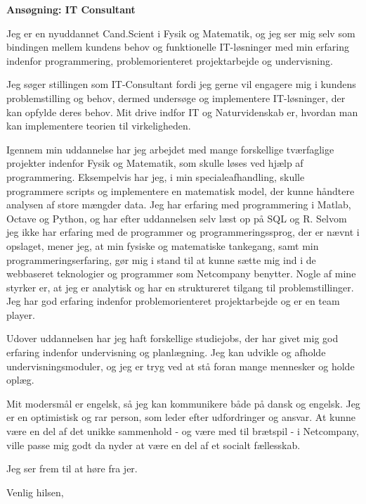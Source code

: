 \documentclass[10pt,a4paper]{letter}
\begin{document}
\begin{letter}{}
\opening{\textbf{Ansøgning: IT Consultant}}
Jeg er en nyuddannet Cand.Scient i Fysik og Matematik, og jeg ser mig selv som bindingen mellem kundens behov og funktionelle IT-løsninger med min erfaring indenfor programmering, problemorienteret projektarbejde og undervisning.

Jeg søger stillingen som IT-Consultant fordi jeg gerne vil engagere mig i kundens problemstilling og behov, dermed undersøge og implementere IT-løsninger, der kan opfylde deres behov. Mit drive indfor IT og Naturvidenskab er, hvordan man kan implementere teorien til virkeligheden.   

Igennem min uddannelse har jeg arbejdet med mange forskellige tværfaglige projekter indenfor Fysik og Matematik, som skulle løses ved hjælp af programmering. Eksempelvis har jeg, i min specialeafhandling, skulle programmere scripts og implementere en matematisk model, der kunne håndtere analysen af store mængder data. Jeg har erfaring med programmering i Matlab, Octave og Python, og har efter uddannelsen selv læst op på SQL og R. Selvom jeg ikke har erfaring med de programmer og programmeringssprog, der er nævnt i opslaget, mener jeg, at min fysiske og matematiske tankegang, samt min programmeringserfaring, gør mig i stand til at kunne sætte mig ind i de webbaseret teknologier og programmer som Netcompany benytter. Nogle af mine styrker er, at jeg er analytisk og har en struktureret tilgang til problemstillinger. Jeg har god erfaring indenfor problemorienteret projektarbejde og er en team player. 

Udover uddannelsen har jeg haft forskellige studiejobs, der har givet mig god erfaring indenfor undervisning og planlægning. Jeg kan udvikle og afholde undervisningsmoduler, og jeg er tryg ved at stå foran mange mennesker og holde oplæg.
     
Mit modersmål er engelsk, så jeg kan kommunikere både på dansk og engelsk. Jeg er en optimistisk og rar person, som leder efter udfordringer og ansvar. At kunne være en del af det unikke sammenhold - og være med til brætspil - i Netcompany, ville passe mig godt da nyder at være en del af et socialt fællesskab.

Jeg ser frem til at høre fra jer.
\closing{Venlig hilsen,}

\end{letter}
\end{document}
